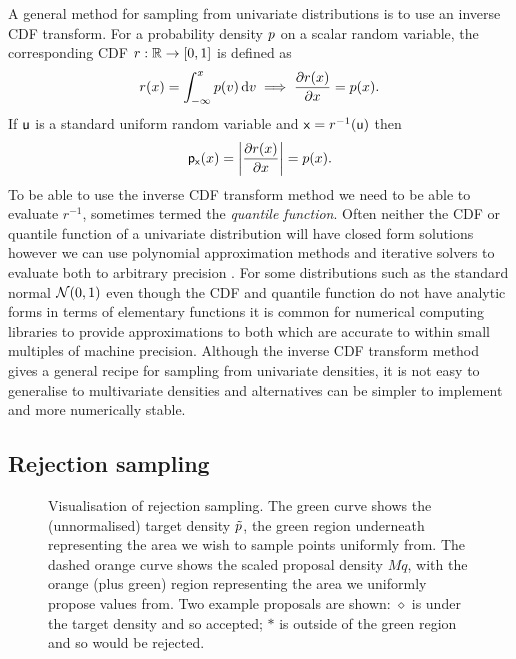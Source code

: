 
A general method for sampling from univariate distributions is to use an inverse \ac{CDF} transform. For a probability density $p$ on a scalar random variable, the corresponding \ac{CDF} $r : \mathbb{R} \to [0,1]$ is defined as
\begin{equation}
  r(x) = \int_{-\infty}^x p(v) \,\mathrm{d} v
  \implies
  \frac{\partial r(x)}{\partial x} = p(x).
\end{equation}
If $\mathsf{u}$ is a standard uniform random variable and $\mathsf{x} = r^{-1}(\mathsf{u})$ then
\begin{equation}
  \pden{\rvar{x}}(x) = \left|\pd{r(x)}{x}\right| = \tgtdens(x).
\end{equation}
To be able to use the inverse \ac{CDF} transform method we need to be able to evaluate $r^{-1}$, sometimes termed the \emph{quantile function}. Often neither the \ac{CDF} or quantile function of a univariate distribution will have closed form solutions however we can use polynomial approximation methods and iterative solvers to evaluate both to arbitrary precision \citep{olver2013fast}. For some distributions such as the standard normal $\nrm{0,1}$ even though the \ac{CDF} and quantile function do not have analytic forms in terms of elementary functions it is common for numerical computing libraries to provide approximations to both which are accurate to within small multiples of machine precision. Although the inverse \ac{CDF} transform method gives a general recipe for sampling from univariate densities, it is not easy to generalise to multivariate densities and alternatives can be simpler to implement and more numerically stable.

\subsection{Rejection sampling}

\begin{figure}[t]
\centering
{}
\caption[Visualisation of rejection sampling.]{Visualisation of rejection sampling. The green curve shows the (unnormalised) target density $\tilde{p}$, the green region underneath representing the area we wish to sample points uniformly from. The dashed orange curve shows the scaled proposal density $M q$, with the orange (plus green) region representing the area we uniformly propose values from. Two example proposals are shown: $\diamond$ is under the target density and so accepted; $*$ is outside of the green region and so would be rejected.}
\label{fig:rejection-sampling}
\end{figure}

